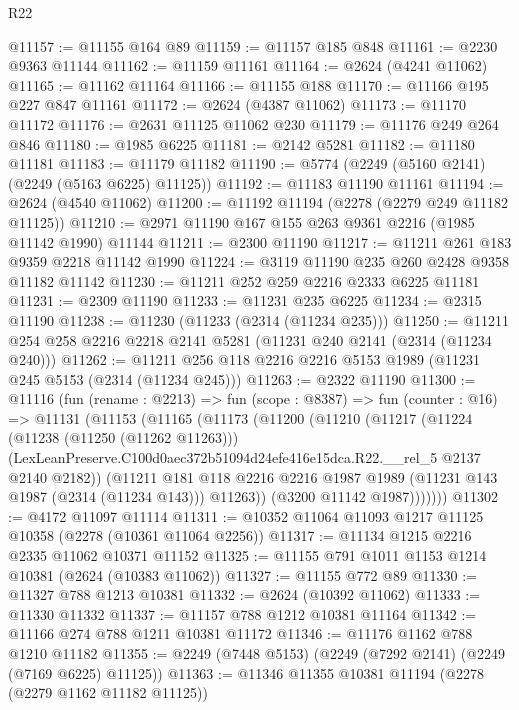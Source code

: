 \begin{lexlean}{R22}
\begin{coremodule}
@11157 := @11155 @164 @89
@11159 := @11157 @185 @848
@11161 := @2230 @9363 @11144
@11162 := @11159 @11161
@11164 := @2624 (@4241 @11062)
@11165 := @11162 @11164
@11166 := @11155 @188
@11170 := @11166 @195 @227 @847 @11161
@11172 := @2624 (@4387 @11062)
@11173 := @11170 @11172
@11176 := @2631 @11125 @11062 @230
@11179 := @11176 @249 @264 @846
@11180 := @1985 @6225
@11181 := @2142 @5281
@11182 := @11180 @11181
@11183 := @11179 @11182
@11190 := @5774 (@2249 (@5160 @2141) (@2249 (@5163 @6225) @11125))
@11192 := @11183 @11190 @11161
@11194 := @2624 (@4540 @11062)
@11200 := @11192 @11194 (@2278 (@2279 @249 @11182 @11125))
@11210 := @2971 @11190 @167 @155 @263 @9361 @2216 (@1985 @11142 @1990) @11144
@11211 := @2300 @11190
@11217 := @11211 @261 @183 @9359 @2218 @11142 @1990
@11224 := @3119 @11190 @235 @260 @2428 @9358 @11182 @11142
@11230 := @11211 @252 @259 @2216 @2333 @6225 @11181
@11231 := @2309 @11190
@11233 := @11231 @235 @6225
@11234 := @2315 @11190
@11238 := @11230 (@11233 (@2314 (@11234 @235)))
@11250 := @11211 @254 @258 @2216 @2218 @2141 @5281 (@11231 @240 @2141 (@2314 (@11234 @240)))
@11262 := @11211 @256 @118 @2216 @2216 @5153 @1989 (@11231 @245 @5153 (@2314 (@11234 @245)))
@11263 := @2322 @11190
@11300 := @11116
    (fun (rename : @2213) =>
    fun (scope : @8387) =>
    fun (counter : @16) =>
    @11131
      (@11153
        (@11165
          (@11173
            (@11200
              (@11210
                (@11217
                  (@11224
                    (@11238 (@11250 (@11262 @11263)))
                    (LexLeanPreserve.C100d0aec372b51094d24efe416e15dca.R22.__rel_5
                      @2137
                      @2140
                      @2182))
                  (@11211
                    @181
                    @118
                    @2216
                    @2216
                    @1987
                    @1989
                    (@11231 @143 @1987 (@2314 (@11234 @143)))
                    @11263))
                (@3200 @11142 @1987)))))))
@11302 := @4172 @11097 @11114
@11311 := @10352 @11064 @11093 @1217 @11125 @10358 (@2278 (@10361 @11064 @2256))
@11317 := @11134 @1215 @2216 @2335 @11062 @10371 @11152
@11325 := @11155 @791 @1011 @1153 @1214 @10381 (@2624 (@10383 @11062))
@11327 := @11155 @772 @89
@11330 := @11327 @788 @1213 @10381
@11332 := @2624 (@10392 @11062)
@11333 := @11330 @11332
@11337 := @11157 @788 @1212 @10381 @11164
@11342 := @11166 @274 @788 @1211 @10381 @11172
@11346 := @11176 @1162 @788 @1210 @11182
@11355 := @2249 (@7448 @5153) (@2249 (@7292 @2141) (@2249 (@7169 @6225) @11125))
@11363 := @11346 @11355 @10381 @11194 (@2278 (@2279 @1162 @11182 @11125))

\end{coremodule}
\end{lexlean}

